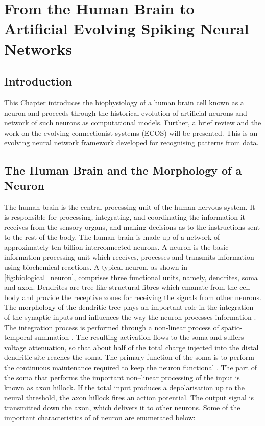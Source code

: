 \chapter{From the Human Brain to Artificial Evolving Spiking Neural Networks} 
\label{chap:snn}

\section{Introduction}
This Chapter introduces the biophysiology of a human brain cell known as a neuron and proceeds through the historical evolution of artificial neurons and network of such neurons as computational models. Further, a brief review and the work on the evolving connectionist systems (ECOS) will be presented. This is an evolving neural network framework developed for recognising patterns from data.   

\section{The Human Brain and the Morphology of a Neuron}  
The human brain is the central processing unit of the human nervous system. It is responsible for processing, integrating, and coordinating the information it receives from the sensory organs, and making decisions as to the instructions sent to the rest of the body. The human brain is made up of a network of approximately ten billion interconnected neurons. A neuron is the basic information processing unit which receives, processes and transmits information using biochemical reactions. A typical neuron, as shown in \figurename \ref{fig:biological_neuron}, comprises three functional units, namely, dendrites, soma and axon. Dendrites are tree-like structural fibres which emanate from the cell body and provide the receptive zones for receiving the signals from other neurons. The morphology of the dendritic tree plays an important role in the integration of the synaptic inputs and influences the way the neuron processes information \citep{mel1994information}. The integration process is performed through a non-linear process of spatio-temporal summation \citep{koch1999neurobiology}. The resulting activation flows to the soma and suffers voltage attenuation, so that about half of the total charge injected into the distal dendritic site reaches the soma. The primary function of the soma is to perform the continuous maintenance required to keep the neuron functional \citep{kandel2000principles}. The part of the soma that performs the important non–linear processing of the input is known as axon hillock. If the total input produces a depolarisation up to the neural threshold, the axon hillock fires an action potential. The output signal is transmitted down the axon, which delivers it to other neurons. Some of the important characteristics of of neuron are enumerated below:

